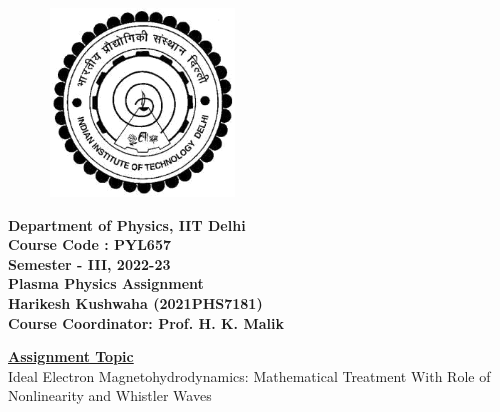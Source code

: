 \documentclass[12pt]{article}
\newenvironment{changemargin}[2]{
\begin{list}{}{
\setlength{\topsep}{0pt}
\setlength{\leftmargin}{#1}
\setlength{\rightmargin}{#2}
\setlength{\listparindent}{\parindent}
\setlength{\itemindent}{\parindent}
\setlength{\parsep}{\parskip}
}
\item[]}{\end{list}}
\begin{document}
\begin{titlepage}
    \begin{changemargin}{-2cm}{-2cm}
        \begin{figure}
            \includegraphics[width=5cm, height=5cm]{logo.png}
            \centering
        \end{figure}
        \begin{center}
            \textbf{\Large{Department of Physics, IIT Delhi}}\\
            \vspace*{1cm}
            \textbf{\Large{Course Code : PYL657}}\\
            \vspace*{0.2cm}
            \textbf{\Large {Semester - III, 2022-23}}\\
            \vspace*{1cm}
            \textbf{\LARGE{Plasma Physics Assignment}}\\
            \vspace*{1cm}
            \textbf{\Large {Harikesh Kushwaha (2021PHS7181)}}\\
            \vspace*{1cm}
            \textbf{\Large {Course Coordinator: Prof. H. K. Malik}}\\
            \vspace*{1cm}
        \end{center}
        \begin{flushleft}
            \underline{\textbf{\LARGE{Assignment Topic}}}\\
            \Large{Ideal Electron Magnetohydrodynamics: Mathematical Treatment With Role of Nonlinearity and Whistler Waves}
        \end{flushleft}
    \end{changemargin}
\end{titlepage}
\end{document}
